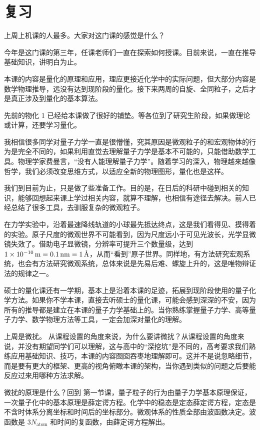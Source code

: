 \section{复习}

上周上机课的人最多。大家对这门课的感觉是什么？

今年是这门课的第三年，任课老师们一直在探索如何授课。目前来说，一直在推导基础知识，讲明白为止。

本课的内容是量化的原理和应用，理应更接近化学中的实际问题，但大部分内容是数学物理推导，远没有达到现阶段的量化。接下来两周的自旋、全同粒子，之后才是真正涉及到量化的基本算法。

先前的物化 1 已经给本课做了很好的铺垫。等各位到了研究生阶段，如果做理论或计算，还要学习量化。

我相信很多同学对量子力学一直是很懵懂，究其原因是微观粒子的和宏观物体的行为是完全不同的，如果利用直觉去理解量子力学是基本不可能的，只能借助数学工具。物理学家费曼言，``没有人能理解量子力学''。随着学习的深入，物理越来越像哲学，我们必须改变思维方式，以适应全新的物理图形，量化也是这样。

我们到目前为止，只是做了些准备工作。目的是，在日后的科研中碰到相关的知识，能够回想起来课上学过相关内容，就算不理解，也相信有途径去解决。前人已经总结了很多工具，去驯服复杂的微观粒子。

在力学实验中，沿着最速降线轨道的小球最先抵达终点，这是我们看得见、摸得着的实验。原子尺度的微观世界不可能看到，因为尺度远小于可见光波长，光学显微镜失效了。借助电子显微镜，分辨率可提升三个数量级，达到 $\SI{1E-10}{\metre} = \SI{0.1}{\nano\metre} = \SI{1}{\angstrom}$，从而``看到''原子世界。同样地，有方法研究宏观系统，也会有方法研究微观系统，总体来说是先易后难、螺旋上升的，这是唯物辩证法的规律之一。

硕士的量化课还有一学期，基本上是沿着本课的足迹，拓展到现阶段使用的量子化学方法。如果你不学本课，直接去听硕士的量化课，可能会感到深深的不安，因为所有的推导都是建立在本课的量子力学基础上的。当你熟练掌握量子力学、高等量子力学、数学物理方法等工具，一定会加深对量化的理解。


上周是微扰。
从课程设置的角度来说，为什么要讲微扰？从课程设置的角度来说，并没有期望同学们可以理解，这与高中的``深挖坑''是不同的，高考要求我们熟练应用基础知识、技巧，本课的内容囫囵吞枣地理解即可。这并不是说忽略细节，而是要有更大的框架、更高的视角俯瞰本课的架构，当你遇到类似的问题之后要能反应过来用哪种方法求解。

微扰的原理是什么？回到
第一节课，量子粒子的行为由量子力学基本原理保证，一次量子化中的基本原理是薛定谔方程。化学中的稳态是定态薛定谔方程，定态是不含时体系分离坐标和时间后的坐标部分。微观体系的性质全部由波函数决定。波函数是 $3N_{\text{atom}}$ 和时间的复函数，由薛定谔方程解出。

